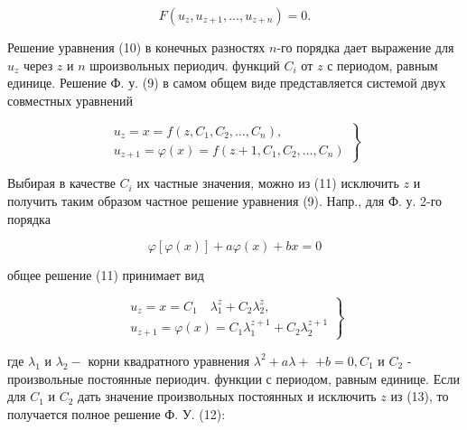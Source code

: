 \documentclass[10pt]{article}
\begin{document}
\[

F\left(u_{z}, u_{z+1}, \ldots, u_{z+n}\right)=0 .

\]



Решение уравнения (10) в конечных разностях $n$-го порядка дает выражение для $u_{z}$ через $z$ и $n$ шроизвольных периодич. функций $C_{i}$ от $z$ с периодом, равным единице. Решение Ф. у. (9) в самом общем виде представляется системой двух совместных уравнений



\[

\left.\begin{array}{c}

u_{z}=x=f\left(z, C_{1}, C_{2}, \ldots, C_{n}\right), \\

u_{z+1}=\varphi(x)=f\left(z+1, C_{1}, C_{2}, \ldots, C_{n}\right)

\end{array}\right\}

\]



Выбирая в качестве $C_{i}$ их частные значения, можно из (11) исключить $z$ и получить таким образом частное решение уравнения (9). Напр., для Ф. у. 2-го порядка



\[

\varphi[\varphi(x)]+a \varphi(x)+b x=0

\]



общее решение (11) принимает вид



\[

\left.\begin{array}{c}

u_{z}=x=C_{1} \quad \lambda_{1}^{z}+C_{2} \lambda_{2}^{z}, \\

u_{z+1}=\varphi(x)=C_{1} \lambda_{1}^{z+1}+C_{2} \lambda_{2}^{z+1}

\end{array}\right\}

\]



где $\lambda_{1}$ и $\lambda_{2}-$ корни квадратного уравнения $\lambda^{2}+a \lambda+$ $+b=0, C_{1}$ и $C_{2}$ - произвольные постоянные периодич. функции с периодом, равным единице. Если для $C_{1}$ и $C_{2}$ дать значение произвольных постоянных и исключить $z$ из (13), то получается полное решение Ф. У. (12):
\end{document}
